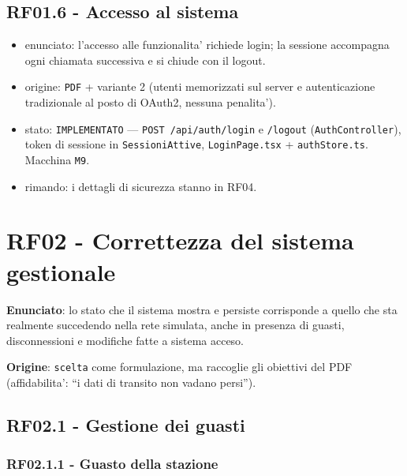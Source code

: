 \documentclass[11pt]{article}
\begin{document}
\subsection{RF01.6 - Accesso al sistema}
\label{sec:org0a6beb1}

\begin{itemize}
\item enunciato: l'accesso alle funzionalita' richiede login; la sessione accompagna ogni chiamata
successiva e si chiude con il logout.
\item origine: \texttt{PDF} + variante 2 (utenti memorizzati sul server e autenticazione tradizionale al posto
di OAuth2, nessuna penalita').
\item stato: \texttt{IMPLEMENTATO} — \texttt{POST /api/auth/login} e \texttt{/logout} (\texttt{AuthController}), token di sessione
in \texttt{SessioniAttive}, \texttt{LoginPage.tsx} + \texttt{authStore.ts}. Macchina \texttt{M9}.
\item rimando: i dettagli di sicurezza stanno in RF04.
\end{itemize}
\section{RF02 - Correttezza del sistema gestionale}
\label{sec:orgd06a467}

\textbf{Enunciato}: lo stato che il sistema mostra e persiste corrisponde a quello che sta realmente
succedendo nella rete simulata, anche in presenza di guasti, disconnessioni e modifiche fatte a
sistema acceso.

\textbf{Origine}: \texttt{scelta} come formulazione, ma raccoglie gli obiettivi del PDF (affidabilita': ``i dati di
transito non vadano persi'').
\subsection{RF02.1 - Gestione dei guasti}
\label{sec:orgee5412f}

\subsubsection{RF02.1.1 - Guasto della stazione}
\label{sec:orgb12639e}
\end{document}
